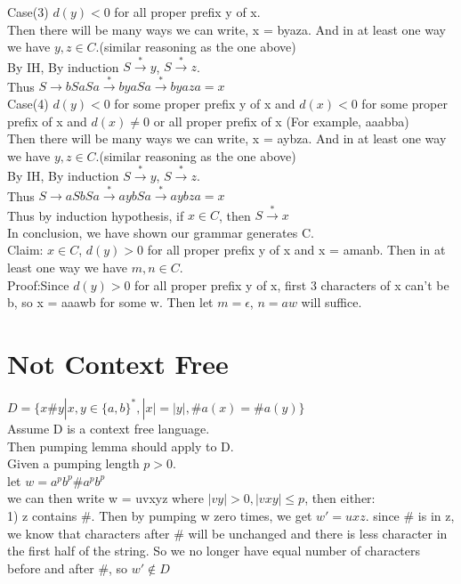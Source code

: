 \documentclass[12pt]{article}
\begin{document}
Case(3) $d(y) < 0$ for all proper prefix y of x.\\
Then there will be many ways we can write, x = byaza. And in at least one way we have $y,z \in C$.(similar reasoning as the one above)\\
By IH, By induction  $S\xrightarrow{*} y$,  $S\xrightarrow{*} z$.\\
Thus  $S\rightarrow bSaSa \xrightarrow{*} byaSa \xrightarrow{*} byaza = x$\\

Case(4) $d(y) < 0$ for some proper prefix y of x and $d(x) < 0$ for some proper prefix of x and $d(x) \ne 0$ or all proper prefix of x (For example, aaabba)\\
Then there will be many ways we can write, x = aybza. And in at least one way we have $y,z \in C$.(similar reasoning as the one above)\\
By IH, By induction  $S\xrightarrow{*} y$,  $S\xrightarrow{*} z$.\\
Thus  $S\rightarrow aSbSa \xrightarrow{*} aybSa \xrightarrow{*} aybza = x$\\

Thus by induction hypothesis,  if $x\in C$, then $S\xrightarrow{*} x$\\

In conclusion, we have shown our grammar generates C.\\


Claim: $x\in C$, $d(y) >0 $ for all proper prefix y of x and x = amanb. Then in at least one way we have $m,n \in C$.\\
Proof:Since  $d(y) >0 $ for all proper prefix y of x, first 3 characters of x can't be b, so x = aaawb for some w. Then let $m = \epsilon$, $n = aw$ will suffice.\\


\pagebreak
\section{Not Context Free}

$D =  \{x\#y |  x,y \in \{ a,b  \}^*,  |x| = |y|, \#a(x) = \#a(y) \}$\\

Assume D is a context free language. \\
Then pumping lemma should apply to D.\\
Given a pumping length $p > 0$.\\
let $w = a^pb^p\#a^pb^p$\\
we can then write w = uvxyz where $|vy| > 0, |vxy| \le p$, then either:\\
1) z contains $\#$. Then by pumping w zero times, we get $w' = uxz$. since $\#$ is in z, we know that characters after $\#$ will be unchanged and there is less character in the first half of the string. So we no longer have equal number of characters before and after $\#$, so $w' \notin D$\\
\end{document}
